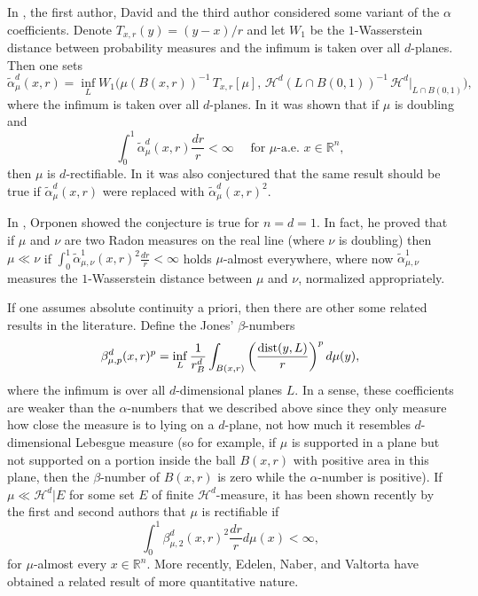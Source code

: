 \documentclass[11pt]{amsart}
\newcommand{\R}{{\mathbb R}}       %
\newcommand{\HH}{{\mathcal H}}
\newcommand{\dist}{{\rm dist}}
\newcommand{\wt}[1]{{\widetilde{#1}}}
\newcommand{\Bl}{\color{blue}}
\theoremstyle{definition}
\theoremstyle{remark}
\numberwithin{equation}{section}
\newcommand{\xavi}[1]{}%
\def\cH{{\mathcal{H}}}
\newcommand{\ps}[1]{\left( #1 \right)}
\begin{document}
In \cite{ADT16}, the first author, David and the third author considered \xavi{I changed the wording in this paragraph}
some variant of the $\alpha$ coefficients. Denote $T_{x,r}(y)= (y-x)/r$ and let
$W_{1}$ be the $1$-Wasserstein distance between probability measures and the infimum is taken over all $d$-planes. Then one sets
\begin{equation}
\label{e:tol15}
\wt{\alpha}_{\mu}^{d}(x,r) = \inf_{L} W_{1}\bigl(\mu(B(x,r))^{-1}\,T_{x,r}[\mu] , \,\cH^{d}(L\cap B(0,1))^{-1}\,\HH^{d}|_{L\cap B(0,1)}\bigr),
\end{equation}
where the infimum is taken over all $d$-planes. 
In \cite{ADT16} it was shown that if $\mu$ is doubling and 
\[
\int_{0}^{1} \wt{\alpha}_{\mu}^{d}(x,r)\frac{dr}{r} < \infty \quad\mbox{ for $\mu$-a.e. }x\in \R^{n},
\] 
then $\mu$ is $d$-rectifiable.
In \cite{ADT16} it was also conjectured that the same result should be true if $\wt{\alpha}_{\mu}^{d}(x,r)$ were replaced with $\wt{\alpha}_{\mu}^{d}(x,r)^{2}$. 

In \cite{Orp17}, Orponen showed the conjecture is true for $n=d=1$. In fact, he proved that if $\mu$ and $\nu$ are two Radon measures on the real line (where $\nu$ is doubling) then $\mu\ll \nu$ if $\int_{0}^{1}\wt{\alpha}_{\mu,\nu}^1(x,r)^{2}\frac{dr}{r}<\infty$ holds $\mu$-almost everywhere, where now $\wt{\alpha}_{\mu,\nu}^1$ measures the $1$-Wasserstein distance between $\mu$ and $\nu$, normalized appropriately.

If one assumes absolute continuity a priori, then there are other some related results in the literature. Define the Jones' $\beta$-numbers
\[
\beta_{\mu,p}^{d}(x,r)^{p}  = \inf_{L} \frac{1}{r_{B}^{d}} \int_{B(x,r)}\ps{\frac{\dist(y,L)}{r}}^{p} d\mu(y),
\]
where the infimum is over all $d$-dimensional planes $L$.
In a sense, these coefficients are weaker than the $\alpha$-numbers that we described above since they only measure how close the measure is to lying on a $d$-plane, not how much it resembles $d$-dimensional Lebesgue measure (so for example, if $\mu$ is supported in a plane but not supported on a portion inside the ball $B(x,r)$ with positive area in this plane, then the $\beta$-number of $B(x,r)$ is zero while the $\alpha$-number is positive). If $\mu\ll\HH^d|E$ for some set $E$ of finite $\HH^d$-measure, it has been shown recently by the first and second authors \cite{AT15} that $\mu$ is rectifiable if 
\begin{equation}\label{e:Bjones}
\int_{0}^{1}\beta_{\mu,2}^{d}(x,r)^{2} \frac{dr}{r} d\mu(x)<\infty,
\end{equation}
for $\mu$-almost every $x\in \R^{n}$. More recently, Edelen, Naber, and Valtorta \cite{ENV16} have obtained a related 
result of more quantitative nature. 
\end{document}
